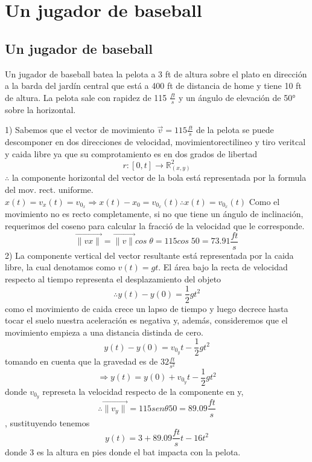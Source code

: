 \chapter*{Un jugador de baseball}
\section*{Un jugador de baseball}
    Un jugador de baseball batea la pelota a 3 ft de altura sobre el plato en dirección a la barda del jardín central que está a 400 ft de distancia de home y tiene 10 ft de altura. La pelota sale con rapidez de 115 $\frac{ft}{s}$ y un ángulo de elevación de 50° sobre la horizontal.
    
    1) Sabemos que el vector de movimiento $\vec{v}=115\frac{ft}{s}$ de la pelota se puede descomponer en dos direcciones de velocidad, movimientorectilineo y tiro veritcal y caida libre ya que su comprotamiento es en dos grados de libertad $$r:\left[0,t\right]\rightarrow \mathbb{R}^2_{(x,y)}$$
    $\therefore$ la componente horizontal del  vector de la bola está representada por la formula del mov. rect. uniforme.$x(t)=v_x(t)=v_{0_x}\Rightarrow x(t)-x_{0}=v_{0_x}(t)\therefore x(t)=v_{0_x}(t)$
    Como el movimiento no es recto completamente, si no que tiene un ángulo de inclinación, requerimos del coseno para calcular la fracció de la velocidad que le corresponde. $$\vec{\|vx\|}=\vec{\|v\|}cos\;\theta = 115cos\;50 = 73.91\frac{ft}{s}$$
    2) La componente vertical del vector resultante está representada por la caida libre, la cual denotamos como $v(t)=gt$.
    El área bajo la recta de velocidad respecto al tiempo representa el desplazamiento del objeto $$\therefore y(t)-y(0)=\frac{1}{2}gt^2$$
    como el movimiento de caida crece un lapso de tiempo y luego decrece hasta tocar el suelo nuestra aceleración es negativa y, además, consideremos que el movimiento empieza a una distancia distinda de cero.$$y(t)-y(0)=v_{0_y}t-\frac{1}{2}gt^2$$ tomando en cuenta que la gravedad es de $32\frac{ft}{s^2}$ $$\Rightarrow y(t)=y(0)+v_{0_y}t-\frac{1}{2}gt^2$$ donde $v_{0_y}$ represeta la velocidad respecto de la componente en y, $$\therefore \vec{\|v_y\|}=115 sen\theta 50=89.09\frac{ft}{s}$$, sustituyendo tenemos$$y(t)=3+89.09\frac{ft}{s}t-16t^2$$ donde 3 es la altura en pies donde el bat impacta con la pelota.
    
    \vspace{5mm} %
    
